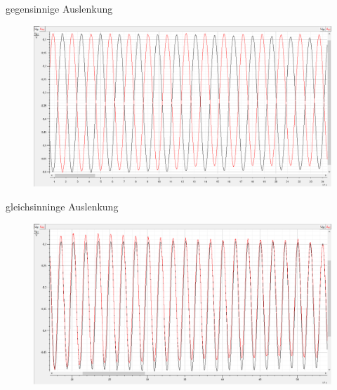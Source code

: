 \documentclass[11pt]{beamer}
\begin{document}
\begin{frame}{gegensinnige Auslenkung}
\begin{figure}[H]
\centering
\includegraphics[scale=0.4]{Bilder/Gegensinnig.png}
\end{figure}
\end{frame}

\begin{frame}{gleichsinninge Auslenkung}
\begin{figure}[H]
\centering
\includegraphics[scale=0.4]{Bilder/Gleichsinnig.png}
\end{figure}
\end{frame}
\end{document}
